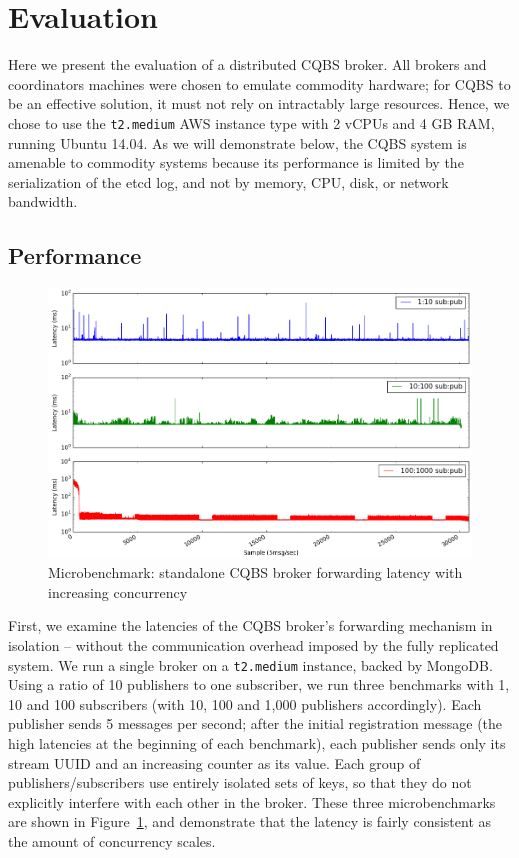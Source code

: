 \section{Evaluation} \label{section:evaluation}

Here we present the evaluation of a distributed CQBS broker.
All brokers and coordinators machines were chosen to emulate commodity hardware; for CQBS to be an effective solution, it must not rely on intractably large resources.
Hence, we chose to use the \texttt{t2.medium} AWS instance type with 2 vCPUs and 4 GB RAM, running Ubuntu 14.04.
As we will demonstrate below, the CQBS system is amenable to commodity systems because its performance is limited by the serialization of the etcd log, and not by memory, CPU, disk, or network bandwidth.

\subsection{Performance}

\begin{figure}[t]
\centering
\includegraphics[width=\linewidth]{figs/singlenodelatency.png}
\caption{Microbenchmark: standalone CQBS broker forwarding latency with increasing concurrency}
\label{fig:singlenodelatency}
\end{figure}

First, we examine the latencies of the CQBS broker's forwarding mechanism in isolation -- without the communication overhead imposed by the fully replicated system.
We run a single broker on a \texttt{t2.medium} instance, backed by MongoDB.
Using a ratio of 10 publishers to one subscriber, we run three benchmarks with 1, 10 and 100 subscribers (with 10, 100 and 1,000 publishers accordingly).
Each publisher sends 5 messages per second; after the initial registration message (the high latencies at the beginning of each benchmark), each publisher sends only its stream UUID and an increasing counter as its value.
Each group of publishers/subscribers use entirely isolated sets of keys, so that they do not explicitly interfere with each other in the broker.
These three microbenchmarks are shown in Figure~\ref{fig:singlenodelatency}, and demonstrate that the latency is fairly consistent as the amount of concurrency scales.

